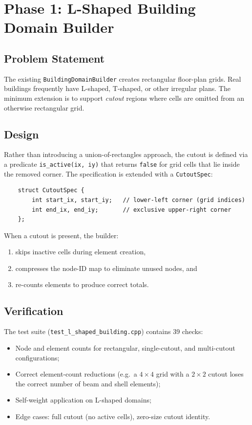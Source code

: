 \section{Phase 1: L-Shaped Building Domain Builder}
\label{sec:phase1_lshape}

\subsection{Problem Statement}

The existing \texttt{BuildingDomainBuilder} creates rectangular floor-plan
grids.  Real buildings frequently have L-shaped, T-shaped, or other irregular
plans.  The minimum extension is to support \emph{cutout} regions where cells
are omitted from an otherwise rectangular grid.

\subsection{Design}

Rather than introducing a union-of-rectangles approach, the cutout is defined
via a predicate \texttt{is\_active(ix, iy)} that returns \texttt{false} for
grid cells that lie inside the removed corner.  The specification is extended
with a \texttt{CutoutSpec}:

\begin{verbatim}
    struct CutoutSpec {
        int start_ix, start_iy;   // lower-left corner (grid indices)
        int end_ix, end_iy;       // exclusive upper-right corner
    };
\end{verbatim}

\noindent
When a cutout is present, the builder:
\begin{enumerate}
  \item skips inactive cells during element creation,
  \item compresses the node-ID map to eliminate unused nodes, and
  \item re-counts elements to produce correct totals.
\end{enumerate}

\subsection{Verification}

The test suite (\texttt{test\_l\_shaped\_building.cpp}) contains 39 checks:
\begin{itemize}
  \item Node and element counts for rectangular, single-cutout, and
        multi-cutout configurations;
  \item Correct element-count reductions (e.g.\ a $4 \times 4$ grid with a
        $2 \times 2$ cutout loses the correct number of beam and shell
        elements);
  \item Self-weight application on L-shaped domains;
  \item Edge cases: full cutout (no active cells), zero-size cutout identity.
\end{itemize}


